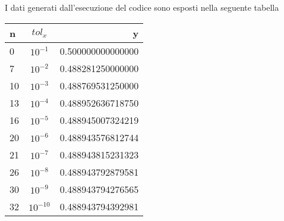 

I dati generati dall'esecuzione del codice sono esposti  nella seguente tabella

\begin{tabular}{l c r}
n & $tol_x$ & y \\
\hline
0 & $10^{-1}$ & 0.500000000000000 \\
7 & $10^{-2}$ & 0.488281250000000 \\
10 & $10^{-3}$ &  0.488769531250000 \\
13 & $10^{-4}$ & 0.488952636718750 \\
16 & $10^{-5}$ & 0.488945007324219 \\
20 & $10^{-6}$ & 0.488943576812744 \\
21 & $10^{-7}$ & 0.488943815231323 \\
26 & $10^{-8}$ & 0.488943792879581 \\
30 & $10^{-9}$ & 0.488943794276565 \\
32 & $10^{-10}$ & 0.488943794392981 \\
\hline
\end{tabular}

